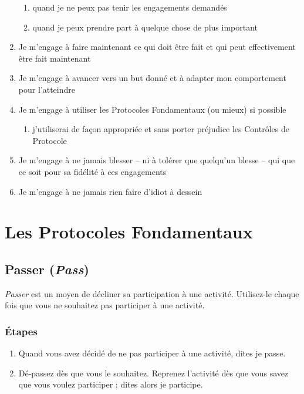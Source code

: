 \documentclass[11pt]{book}
\let\oldsection\section
\renewcommand\section{\clearpage\oldsection}
\begin{document}
\begin{enumerate}
\begin{enumerate}
		\item quand je ne peux pas tenir les engagements demandés
		\item quand je peux prendre part à quelque chose de plus important
	\end{enumerate}
	\item Je m'engage à faire maintenant ce qui doit être fait et qui peut effectivement être fait maintenant
	\item Je m'engage à avancer vers un but donné et à adapter mon comportement pour l'atteindre
	\item Je m'engage à utiliser les Protocoles Fondamentaux (ou mieux) si possible
	\begin{enumerate}
		\item j'utiliserai de façon appropriée et sans porter préjudice les Contrôles de Protocole
	\end{enumerate}
	\item Je m'engage à ne jamais blesser -- ni à tolérer que quelqu'un blesse -- qui que ce soit pour sa fidélité à ces engagements
	\item Je m'engage à ne jamais rien faire d'idiot à dessein
\end{enumerate}

\chapter{Les Protocoles Fondamentaux} \label{core-protocols}

\section{Passer (\emph{Pass})} \label{protocole-passer}

\emph{Passer} est un moyen de décliner sa participation à une activité. Utilisez-le chaque fois que vous ne souhaitez pas
participer à une activité.

\subsection{Étapes}
\begin{enumerate}
	\item Quand vous avez décidé de ne pas participer à une activité, dites \og{}je passe\fg{}.
	\item \og{}Dé-passez\fg{} dès que vous le souhaitez. Reprenez l'activité dès que vous savez que vous voulez participer ;
	      dites alors \og{}je participe\fg{}.
\end{enumerate}
\end{document}
